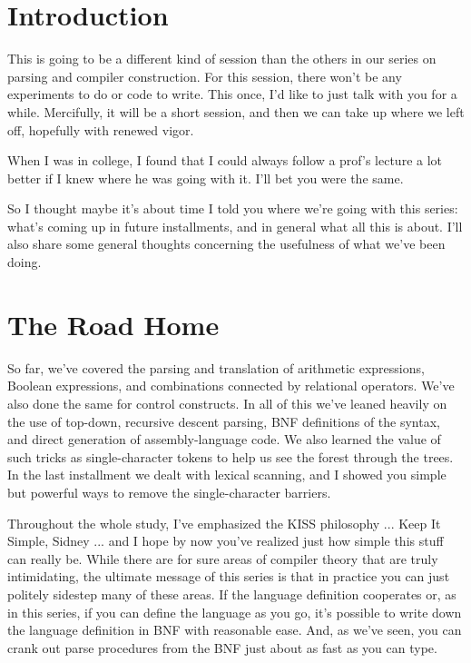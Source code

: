 \documentclass[float=false, crop=false]{standalone}
\begin{document}
\section{Introduction}

This is going to be a different kind of session than the others in our series on
parsing and compiler construction. For this session, there won't be any
experiments to do or code to write. This once, I'd like to just talk with you
for a while. Mercifully, it will be a short session, and then we can take up
where we left off, hopefully with renewed vigor.

When I was in college, I found that I could always follow a prof's lecture a lot
better if I knew where he was going with it. I'll bet you were the same.

So I thought maybe it's about time I told you where we're going with this
series: what's coming up in future installments, and in general what all this is
about. I'll also share some general thoughts concerning the usefulness of what
we've been doing.

\section{The Road Home}

So far, we've covered the parsing and translation of arithmetic expressions,
Boolean expressions, and combinations connected by relational operators. We've
also done the same for control constructs. In all of this we've leaned heavily
on the use of top-down, recursive descent parsing, BNF definitions of the
syntax, and direct generation of assembly-language code. We also learned the
value of such tricks as single-character tokens to help us see the forest
through the trees. In the last installment we dealt with lexical scanning, and I
showed you simple but powerful ways to remove the single-character barriers.

Throughout the whole study, I've emphasized the KISS philosophy ... Keep It
Simple, Sidney ... and I hope by now you've realized just how simple this stuff
can really be. While there are for sure areas of compiler theory that are truly
intimidating, the ultimate message of this series is that in practice you can
just politely sidestep many of these areas. If the language definition
cooperates or, as in this series, if you can define the language as you go, it's
possible to write down the language definition in BNF with reasonable ease. And,
as we've seen, you can crank out parse procedures from the BNF just about as
fast as you can type.
\end{document}
